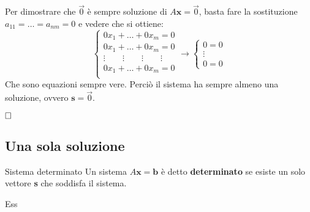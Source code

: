 \begin{newdim}
    Per dimostrare che $\vec 0$ è sempre soluzione di $A\textbf{x} = \vec 0$, basta fare la sostituzione $a_{11} = \dots = a_{nm} = 0$ e vedere che si ottiene:
    \[
        \begin{cases}
            0x_{1} + \dots + 0x_{m} = 0 \\
            0x_{1} + \dots + 0x_{m} = 0 \\
            \vdots \quad\quad \vdots \quad\quad \vdots \quad\quad \vdots \\
            0x_{1} + \dots + 0x_{m} = 0 \\  
        \end{cases}
        \rightarrow
        \begin{cases}
            0 = 0 \\
            \vdots \\
            0 = 0
        \end{cases}
    \]
    Che sono equazioni sempre vere. Perciò il sistema ha sempre almeno una soluzione, ovvero $\textbf{s} = \vec 0$.

    $\qedwhite$
\end{newdim}
\subsection{Una sola soluzione}
\begin{newdef}{Sistema determinato}
    Un sistema $A\textbf{x} = \textbf{b}$ è detto \textbf{determinato} se esiste un solo vettore \textbf{s} che soddisfa il sistema.
\end{newdef}
Ess